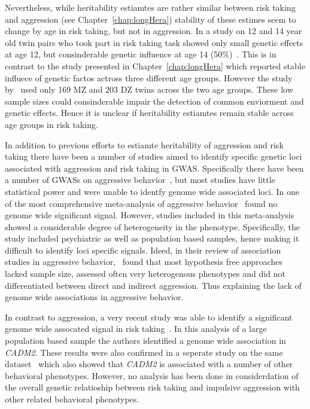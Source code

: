 Nevertheless, while heritability estiamtes are rather similar between risk taking~\cite{Anokhin2009} and aggression (see Chapter~\ref{chap:longHera}) stability of these estimes seem to change by age in risk taking, but not in aggression.
In a study on 12 and 14 year old twin pairs who took part in risk taking task showed only small genetic effects at age 12, but consinderable genetic influence at age 14 (50\%)~\cite{Anokhin2009}.
This is in contrast to the study presented in Chapter~\ref{chap:longHera} which reported stable influece of genetic factos actross three different age groups.
However the study by~\citet{Anokhin2009} used only 169 MZ and 203 DZ twins across the two age groups.
These low sample sizes could consinderable impair the detection of common enviorment and genetic effects. 
Hence it is unclear if heritability estiamtes remain stable across age groups in risk taking.

In addition to previous efforts to estiamte heritability of aggression and risk taking there have been a number of studies aimed to identify specific genetic loci associated with aggression and risk taking in GWAS\@.
Specifically there have been a number of GWASs on aggressive behavior~\cite{Fernandez-Castillo2016}, but most studies have little statistical power and were unable to identfy genome wide associated loci.
In one of the most comprehensive meta-analysis of aggressive behavior~\citet{Vassos2014} found no genome wide significant signal.
However, studies included in this meta-analysis showed a considerable degree of heterogeneity in the phenotype.
Specifically, the study included psychiatric as well as population based samples, hence making it difficult to identify loci specific signals.
Ideed, in their review of association studies in aggressive behavior,~\citet{Fernandez-Castillo2016} found that most hypothesis free approaches lacked sample size, assessed often very heterogenous phenotypes and did not differentiated between direct and indirect aggression. 
Thus explaining the lack of genome wide associations in aggressive behavior.

In contrast to aggression, a very recent study was able to identify a significant genome wide assocated signal in risk taking~\cite{Day2016}. 
In this analysis of a large population based sample the authors identified a genome wide association in \textit{CADM2}.
These results were also confirmed in a seperate study on the same dataset~\cite{Boutwell2017} which also showed that \textit{CADM2} is associated with a number of other behavioral phenotypes.
However, no analysis has been done in considerdation of the overall genetic relatioship between risk taking and impulsive aggression with other related behavioral phenotypes.

